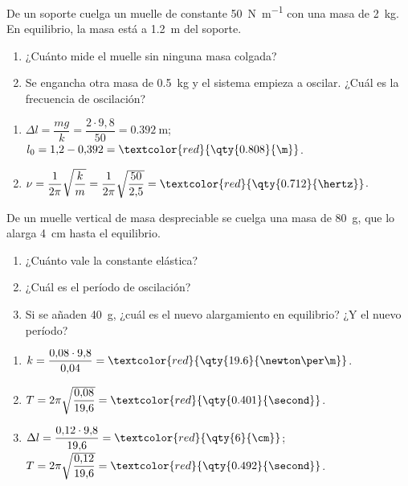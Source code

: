 \begin{exercise}
    De un soporte cuelga un muelle de constante \qty{50}{\newton\per\m} con una masa de \qty{2}{\kg}. En equilibrio, la masa
    está a \qty{1.2}{\m} del soporte.
    \begin{enumerate}[label=\letraminuscula]
        \item ¿Cuánto mide el muelle sin ninguna masa colgada?
        \item Se engancha otra masa de \qty{0.5}{\kg} y el sistema empieza a oscilar. ¿Cuál es la frecuencia de oscilación?
    \end{enumerate}
    \begin{solu}
        \begin{enumerate}[label=\letraminuscula]
            \item \(\Delta l = \dfrac{mg}{k} = \dfrac{2\cdot 9{,}8}{50} = \qty{0.392}{\m}\); \(l_0 = 1{,}2 - 0{,}392 = \textcolor{red}{\qty{0.808}{\m}}\).
            \item \(\nu = \dfrac{1}{2\pi}\sqrt{\dfrac{k}{m}} = \dfrac{1}{2\pi}\sqrt{\dfrac{50}{2{,}5}} = \textcolor{red}{\qty{0.712}{\hertz}}\).
        \end{enumerate}
    \end{solu}
\end{exercise}

\begin{exercise}
    De un muelle vertical de masa despreciable se cuelga una masa de \qty{80}{\g}, que lo alarga \qty{4}{\cm} hasta el
    equilibrio.
    \begin{enumerate}[label=\letraminuscula]
        \item ¿Cuánto vale la constante elástica?
        \item ¿Cuál es el período de oscilación?
        \item Si se añaden \qty{40}{\g}, ¿cuál es el nuevo alargamiento en equilibrio? ¿Y el nuevo período?
    \end{enumerate}
    \begin{solu}
        \begin{enumerate}[label=\letraminuscula]
            \item \(k = \dfrac{0{,}08\cdot 9{,}8}{0{,}04} = \textcolor{red}{\qty{19.6}{\newton\per\m}}\).
            \item \(T = 2\pi\sqrt{\dfrac{0{,}08}{19{,}6}} = \textcolor{red}{\qty{0.401}{\second}}\).
            \item \(\Delta l = \dfrac{0{,}12\cdot 9{,}8}{19{,}6} = \textcolor{red}{\qty{6}{\cm}}\); \(T = 2\pi\sqrt{\dfrac{0{,}12}{19{,}6}} = \textcolor{red}{\qty{0.492}{\second}}\).
        \end{enumerate}
    \end{solu}
\end{exercise}


